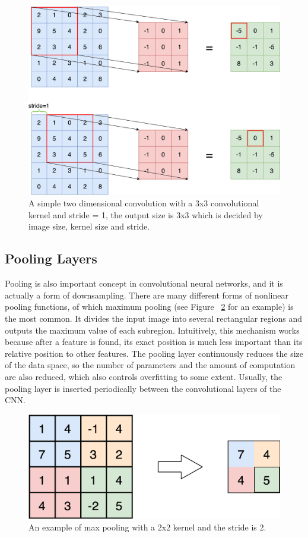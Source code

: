 \begin{figure}[H]
	\centering
	\includegraphics[width=0.6\linewidth]{figures/conv}
	\caption[An example of two-dimensional convolution]{A simple two dimensional convolution with a 3x3 convolutional kernel and stride = 1, the output size is 3x3 which is decided by image size, kernel size and stride.}
	\label{fig:conv}
\end{figure}

\subsection{Pooling Layers}

Pooling is also important concept in convolutional neural networks, and it is actually a form of downsampling. There are many different forms of nonlinear pooling functions, of which maximum pooling (see Figure ~\ref{fig:maxpool} for an example) is the most common. It divides the input image into several rectangular regions and outputs the maximum value of each subregion. Intuitively, this mechanism works because after a feature is found, its exact position is much less important than its relative position to other features. The pooling layer continuously reduces the size of the data space, so the number of parameters and the amount of computation are also reduced, which also controls overfitting to some extent. Usually, the pooling layer is inserted periodically between the convolutional layers of the CNN.

\begin{figure}[H]
	\centering
	\includegraphics[width=0.6\linewidth]{figures/maxpool}
	\caption[An example of max pooling]{An example of max pooling with a 2x2 kernel and the stride is 2.}
	\label{fig:maxpool}
\end{figure}

